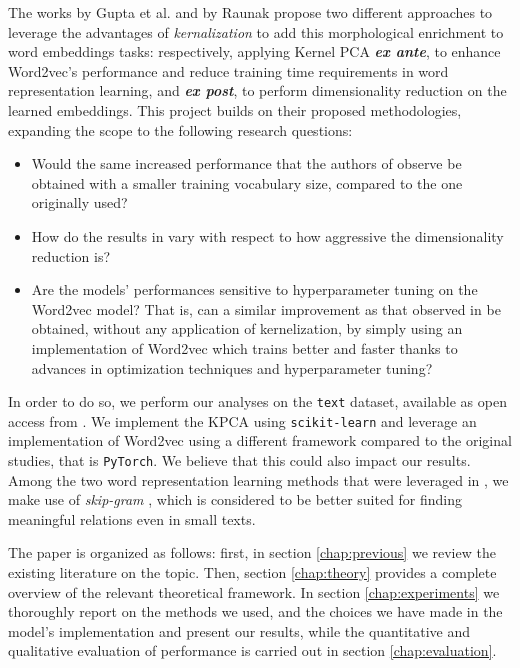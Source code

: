 The works by Gupta et al. \cite{gupta_improving_2019} and by Raunak \cite{raunak_simple_2017} propose two different approaches to leverage the advantages of \textit{kernalization} to add this morphological enrichment to word embeddings tasks: respectively, applying Kernel PCA \textbf{\textit{ex ante}}, to enhance Word2vec's performance and reduce training time requirements in word representation learning, and \textbf{\textit{ex post}}, to perform dimensionality reduction on the learned embeddings. 
This project builds on their proposed methodologies, expanding the scope to the following research questions:
\begin{itemize}
    \item Would the same increased performance that the authors of \cite{gupta_improving_2019} observe be obtained with a smaller training vocabulary size, compared to the one originally used?
    \item How do the results in  \cite{raunak_simple_2017} vary with respect to how aggressive the dimensionality reduction is?
    \item Are the models' performances sensitive to hyperparameter tuning on the Word2vec model? That is, can a similar improvement as that observed in \cite{gupta_improving_2019} be obtained, without any application of kernelization, by simply using an implementation of Word2vec which trains better and faster thanks to advances in optimization techniques and hyperparameter tuning?
\end{itemize}

In order to do so, we perform our analyses on the \texttt{text} dataset, available as open access from \cite{lhoest_huggingfacedatasets_2021}.
We implement the KPCA using \texttt{scikit-learn} and leverage an implementation of  Word2vec using a different framework compared to the original studies, that is \texttt{PyTorch}. 
We believe that this could also impact our results.
Among the two word representation learning methods that were leveraged in \cite{gupta_improving_2019}, we make use of \textit{skip-gram} \cite{mikolov_efficient_2013}, which is considered \cite{mikolov_distributed_2013} to be better suited for finding meaningful relations even in small texts. 

The paper is organized as follows: first, in section \ref{chap:previous} we review the existing literature on the topic. 
Then, section \ref{chap:theory} provides a complete overview of the relevant theoretical framework.
In section \ref{chap:experiments} we thoroughly report on the methods we used, and the choices we have made in the model's implementation and present our results, while the quantitative and qualitative evaluation of performance is carried out in section \ref{chap:evaluation}.
